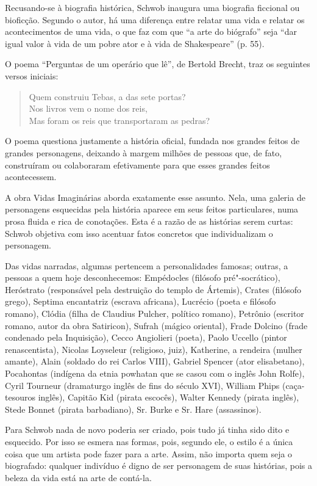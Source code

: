 \documentclass[12pt]{extarticle}
\begin{document}
Recusando-se à biografia histórica, Schwob inaugura uma biografia
ficcional ou bioficção. Segundo o autor, há uma diferença entre relatar
uma vida e relatar os acontecimentos de uma vida, o que faz com que ``a
arte do biógrafo'' seja ``dar igual valor à vida de um pobre ator e à
vida de Shakespeare'' (p. 55).

O poema ``Perguntas de um operário que lê'', de Bertold Brecht, traz os
seguintes versos iniciais:

\begin{verse}
Quem construiu Tebas, a das sete portas?\\
Nos livros vem o nome dos reis,\\
Mas foram os reis que transportaram as pedras?\\
\end{verse}

O poema questiona justamente a história oficial, fundada nos grandes
feitos de grandes personagens, deixando à margem milhões de pessoas que,
de fato, construíram ou colaboraram efetivamente para que esses grandes
feitos acontecessem.

A obra Vidas Imaginárias aborda exatamente esse assunto. Nela, uma
galeria de personagens esquecidas pela história aparece em seus feitos
particulares, numa prosa fluida e rica de conotações. Esta é a razão de
as histórias serem curtas: Schwob objetiva com isso acentuar fatos
concretos que individualizam o personagem.

Das vidas narradas, algumas pertencem a personalidades famosas; outras,
a pessoas a quem hoje desconhecemos: Empédocles (filósofo
pré"-socrático), Heróstrato (responsável pela destruição do templo de
Ártemis), Crates (filósofo grego), Septima encantatriz (escrava
africana), Lucrécio (poeta e filósofo romano), Clódia (filha de Claudius
Pulcher, político romano), Petrônio (escritor romano, autor da obra
Satiricon), Sufrah (mágico oriental), Frade Dolcino (frade condenado
pela Inquisição), Cecco Angiolieri (poeta), Paolo Uccello (pintor
renascentista), Nicolas Loyseleur (religioso, juiz), Katherine, a
rendeira (mulher amante), Alain (soldado do rei Carlos VIII), Gabriel
Spencer (ator elisabetano), Pocahontas (indígena da etnia powhatan que
se casou com o inglês John Rolfe), Cyril Tourneur (dramaturgo inglês de
fins do século XVI), William Phips (caça-tesouros inglês), Capitão Kid
(pirata escocês), Walter Kennedy (pirata inglês), Stede Bonnet (pirata
barbadiano), Sr. Burke e Sr. Hare (assassinos).

Para Schwob nada de novo poderia ser criado, pois tudo já tinha sido
dito e esquecido. Por isso se esmera nas formas, pois, segundo ele, o
estilo é a única coisa que um artista pode fazer para a arte. Assim, não
importa quem seja o biografado: qualquer indivíduo é digno de ser
personagem de suas histórias, pois a beleza da vida está na arte de
contá-la.
\end{document}

